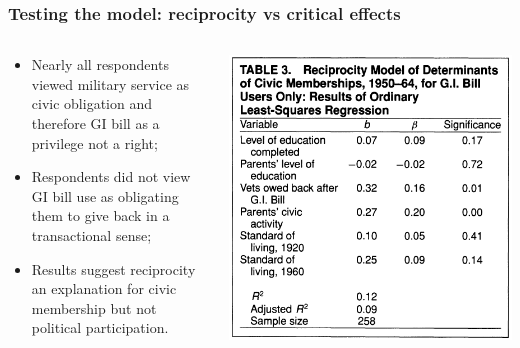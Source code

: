 \documentclass[aspectratio=169]{beamer}
\theoremstyle{principle}
\begin{document}
\begin{frame}
\frametitle{Testing the model: reciprocity vs critical effects}
\begin{columns}
\begin{column}{0.5\textwidth}

\begin{itemize}
\item Nearly all respondents viewed military service as civic obligation and therefore GI bill as a privilege not a right;
\bigskip
\bigskip
\item Respondents did not view GI bill use as obligating them to give back in a transactional sense;
\bigskip
\bigskip
\item Results suggest reciprocity an explanation for civic membership but not political participation.
\end{itemize}
\end{column}
\begin{column}{0.5\textwidth}
\begin{center}
\includegraphics[scale=0.4]{table_3.png}
\end{center}
\end{column}
\end{columns}

\end{frame}
\end{document}
